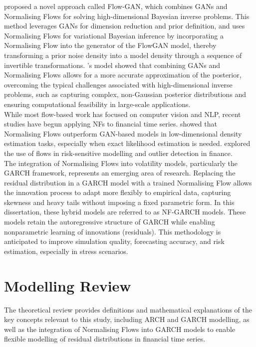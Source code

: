 \documentclass[oneside,12pt]{CUEDthesisPSnPDF}
\newcommand{\textcite}{\citet}
\begin{document}
\textcite{dasgupta2022flowgan} proposed a novel approach called Flow-GAN, which combines GANs and Normalising Flows for solving high-dimensional Bayesian inverse problems. This method leverages GANs for dimension reduction and prior definition, and uses Normalising Flows for variational Bayesian inference by incorporating a Normalising Flow into the generator of the FlowGAN model, thereby transforming a prior noise density into a model density through a sequence of invertible transformations. \textcite{dasgupta2022flowgan}'s model showed that combining GANs and Normalising Flows allows for a more accurate approximation of the posterior, overcoming the typical challenges associated with high-dimensional inverse problems, such as capturing complex, non-Gaussian posterior distributions and ensuring computational feasibility in large-scale applications.\\

While most flow-based work has focused on computer vision and NLP, recent studies have begun applying NFs to financial time series. \textcite{liu2020flows} showed that Normalising Flows outperform GAN-based models in low-dimensional density estimation tasks, especially when exact likelihood estimation is needed. \textcite{amini2020deep} explored the use of flows in risk-sensitive modelling and outlier detection in finance.\\

The integration of Normalising Flows into volatility models, particularly the GARCH framework, represents an emerging area of research. Replacing the residual distribution in a GARCH model with a trained Normalising Flow allows the innovation process to adapt more flexibly to empirical data, capturing skewness and heavy tails without imposing a fixed parametric form. In this dissertation, these hybrid models are referred to as NF-GARCH models. These models retain the autoregressive structure of GARCH while enabling nonparametric learning of innovations (residuals). This methodology is anticipated to improve simulation quality, forecasting accuracy, and risk estimation, especially in stress scenarios.\\


\section{Modelling Review}
\noindent 
The theoretical review provides definitions and mathematical explanations of the key concepts relevant to this study, including ARCH and GARCH modelling, as well as the integration of Normalising Flows into GARCH models to enable flexible modelling of residual distributions in financial time series.\\
\end{document}
